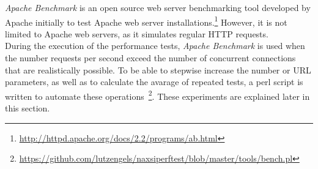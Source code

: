 \emph{Apache Benchmark} is an open source web server benchmarking tool developed by Apache initially to test Apache web server installations.\footnote{\url{http://httpd.apache.org/docs/2.2/programs/ab.html}} However, it is not limited to Apache web servers, as it simulates regular HTTP requests.\\
During the execution of the performance tests, \emph{Apache Benchmark} is used when the number requests per second exceed the number of concurrent connections that are realistically possible. To be able to stepwise increase the number or URL parameters, as well as to calculate the avarage of repeated tests, a perl script is written to automate these operations~\footnote{\url{https://github.com/lutzengels/naxsiperftest/blob/master/tools/bench.pl}}.  These experiments are explained later in this section.
